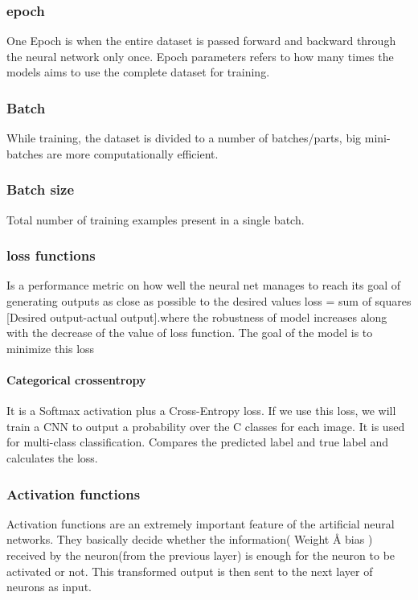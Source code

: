 \subsubsection{epoch}
One Epoch is when the entire dataset is passed forward and backward through the
neural network only once. Epoch parameters refers to how many times the models aims
to use the complete dataset for training.
\subsubsection{Batch}
While training, the dataset is divided to a number of batches/parts, big mini-batches
are more computationally efficient.

\subsubsection{Batch size}
Total number of training examples present in a single batch.

\subsubsection{loss functions}
Is a performance metric on how well the neural net manages to reach its goal of
generating outputs as close as possible to the desired values loss = sum of squares
[Desired output-actual output].where the robustness of model increases along with the
decrease of the value of loss function. The goal of the model is to minimize this loss

\paragraph{Categorical crossentropy} It is a Softmax activation plus a Cross-Entropy loss. If we
use this loss, we will train a CNN to output a probability over the C classes for each image. It is used for multi-class classification. Compares the predicted label and true
label and calculates the loss.
\subsubsection{Activation functions}
Activation functions are an extremely important feature of the artificial neural
networks. They basically decide whether the information( Weight Å bias ) received by
the neuron(from the previous layer) is enough for the neuron to be activated or not. This
transformed output is then sent to the next layer of neurons as input.


